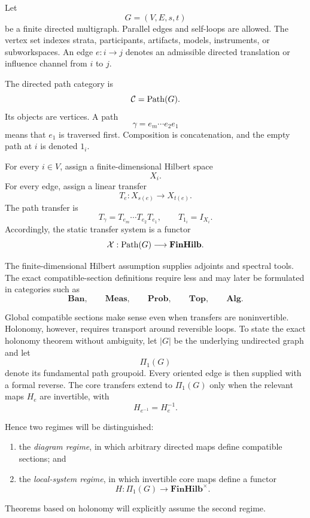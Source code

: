 

\begin{definition}\label{def:interaction-graph}
Let
\[
G=(V,E,s,t)
\]
be a finite directed multigraph. Parallel edges and self-loops are allowed.
The vertex set indexes strata, participants, artifacts, models, instruments,
or subworkspaces. An edge \(e:i\to j\) denotes an admissible directed
translation or influence channel from \(i\) to \(j\).
\end{definition}

The directed path category is
\[
\mathcal C=\operatorname{Path}(G).
\]
Its objects are vertices. A path
\[
\gamma=e_m\cdots e_2e_1
\]
means that \(e_1\) is traversed first. Composition is concatenation, and the
empty path at \(i\) is denoted \(1_i\).

For every \(i\in V\), assign a finite-dimensional Hilbert space
\[
X_i.
\]
For every edge, assign a linear transfer
\[
T_e:X_{s(e)}\longrightarrow X_{t(e)}.
\]
The path transfer is
\[
T_\gamma=T_{e_m}\cdots T_{e_2}T_{e_1},
\qquad
T_{1_i}=I_{X_i}.
\]
Accordingly, the static transfer system is a functor
\[
\mathcal X:\operatorname{Path}(G)\longrightarrow\mathbf{FinHilb}.
\]

The finite-dimensional Hilbert assumption supplies adjoints and spectral
tools. The exact compatible-section definitions require less and may later be
formulated in categories such as
\[
\mathbf{Ban},\qquad
\mathbf{Meas},\qquad
\mathbf{Prob},\qquad
\mathbf{Top},\qquad
\mathbf{Alg}.
\]


Global compatible sections make sense even when transfers are noninvertible.
Holonomy, however, requires transport around reversible loops. To state the
exact holonomy theorem without ambiguity, let \(|G|\) be the underlying
undirected graph and let
\[
\Pi_1(G)
\]
denote its fundamental path groupoid. Every oriented edge is then supplied
with a formal reverse. The core transfers extend to \(\Pi_1(G)\) only when
the relevant maps \(H_e\) are invertible, with
\[
H_{e^{-1}}=H_e^{-1}.
\]

Hence two regimes will be distinguished:
\begin{enumerate}
\item the \emph{diagram regime}, in which arbitrary directed maps define
compatible sections; and
\item the \emph{local-system regime}, in which invertible core maps define a
functor
\[
H:\Pi_1(G)\to\mathbf{FinHilb}^{\times}.
\]
\end{enumerate}
Theorems based on holonomy will explicitly assume the second regime.

